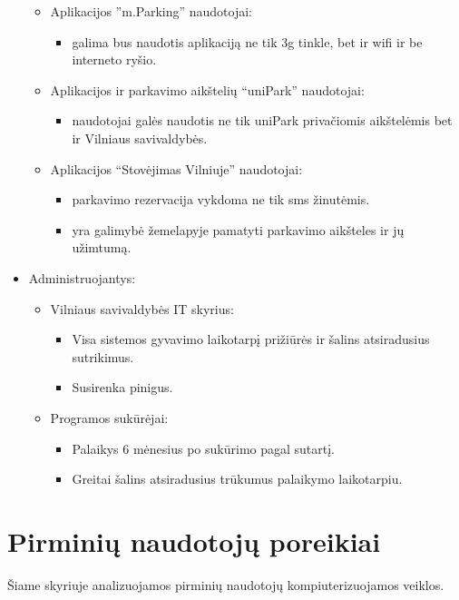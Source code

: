\documentclass{VUMIFPSkursinis}
\begin{document}
\begin{itemize}[label={}]
\begin{itemize}[label={$\bullet$}]
\begin{itemize}[label={--}]
				\end{itemize}					
			\item Aplikacijos ”m.Parking” naudotojai:
				\begin{itemize}[label={--}]
					\item galima bus naudotis aplikaciją ne tik 3g tinkle, bet ir wifi ir be interneto ryšio.
				\end{itemize}
			\item Aplikacijos ir parkavimo aikštelių “uniPark” naudotojai:
				\begin{itemize}[label={--}]
					\item naudotojai galės naudotis ne tik uniPark privačiomis aikštelėmis bet ir Vilniaus savivaldybės.
				\end{itemize}
			\item Aplikacijos “Stovėjimas Vilniuje” naudotojai:
				\begin{itemize}[label={--}]
					\item parkavimo rezervacija vykdoma ne tik sms žinutėmis.
					\item yra galimybė žemelapyje pamatyti parkavimo aikšteles ir jų užimtumą.
				\end{itemize}
		\end{itemize}
	\item Administruojantys:
		\begin{itemize}[label={$\bullet$}]
			\item Vilniaus savivaldybės IT skyrius:
				\begin{itemize}[label={--}]
					\item Visa sistemos gyvavimo laikotarpį prižiūrės ir šalins atsiradusius sutrikimus.
					\item Susirenka pinigus.
				\end{itemize}					
			\item Programos sukūrėjai:
				\begin{itemize}[label={--}]
					\item Palaikys 6 mėnesius po sukūrimo pagal sutartį.
					\item Greitai šalins atsiradusius trūkumus palaikymo laikotarpiu.
				\end{itemize}
		\end{itemize}
\end{itemize}

\section{Pirminių naudotojų poreikiai}
Šiame skyriuje analizuojamos pirminių naudotojų kompiuterizuojamos veiklos.
\end{document}

